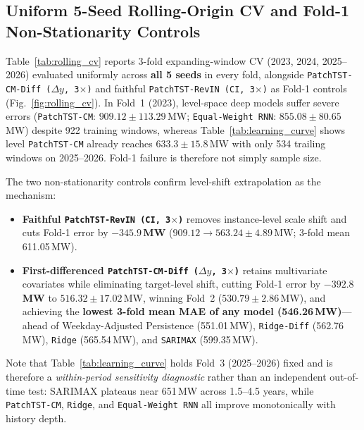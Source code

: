 \documentclass[5p,twocolumn,authoryear]{elsarticle}
\begin{document}
\FloatBarrier

\subsection{Uniform 5-Seed Rolling-Origin CV and Fold-1 Non-Stationarity Controls}
Table~\ref{tab:rolling_cv} reports 3-fold expanding-window CV (2023, 2024, 2025--2026) evaluated uniformly across \textbf{all 5 seeds} in every fold, alongside \texttt{PatchTST-CM-Diff ($\Delta y$, 3$\times$)} and faithful \texttt{PatchTST-RevIN (CI, 3$\times$)} as Fold-1 controls (Fig.~\ref{fig:rolling_cv}). In Fold~1 (2023), level-space deep models suffer severe errors (\texttt{PatchTST-CM}: $909.12 \pm 113.29$\,MW; \texttt{Equal-Weight RNN}: $855.08 \pm 80.65$\,MW) despite 922 training windows, whereas Table~\ref{tab:learning_curve} shows level \texttt{PatchTST-CM} already reaches $633.3 \pm 15.8$\,MW with only 534 trailing windows on 2025--2026. Fold-1 failure is therefore not simply sample size.

The two non-stationarity controls confirm level-shift extrapolation as the mechanism:
\begin{itemize}
    \item \textbf{Faithful \texttt{PatchTST-RevIN (CI, 3$\times$)}} removes instance-level scale shift and cuts Fold-1 error by \textbf{$-345.9$\,MW} ($909.12 \to 563.24 \pm 4.89$\,MW; 3-fold mean 611.05\,MW).
    \item \textbf{First-differenced \texttt{PatchTST-CM-Diff ($\Delta y$, 3$\times$)}} retains multivariate covariates while eliminating target-level shift, cutting Fold-1 error by \textbf{$-392.8$\,MW} to $516.32 \pm 17.02$\,MW, winning Fold~2 ($530.79 \pm 2.86$\,MW), and achieving the \textbf{lowest 3-fold mean MAE of any model (546.26\,MW)}---ahead of Weekday-Adjusted Persistence (551.01\,MW), \texttt{Ridge-Diff} (562.76\,MW), \texttt{Ridge} (565.54\,MW), and \texttt{SARIMAX} (599.35\,MW).
\end{itemize}
Note that Table~\ref{tab:learning_curve} holds Fold~3 (2025--2026) fixed and is therefore a \textit{within-period sensitivity diagnostic} rather than an independent out-of-time test: SARIMAX plateaus near 651\,MW across 1.5--4.5 years, while \texttt{PatchTST-CM}, \texttt{Ridge}, and \texttt{Equal-Weight RNN} all improve monotonically with history depth.
\end{document}
